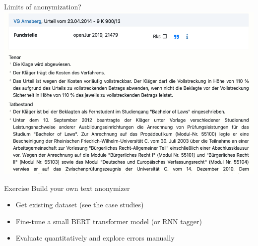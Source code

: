 \documentclass[12pt,aspectratio=169,handout]{beamer}
\begin{document}
\begin{frame}{Limits of anonymization?}
\includegraphics[width=\linewidth]{img/hagen2}
\end{frame}




\begin{frame}{Exercise}
Build your own text anonymizer
\begin{itemize}
\item Get existing dataset (see the case studies)
\item Fine-tune a small BERT transformer model (or RNN tagger)
\item Evaluate quantitatively and explore errors manually
\end{itemize}
\end{frame}
\end{document}
